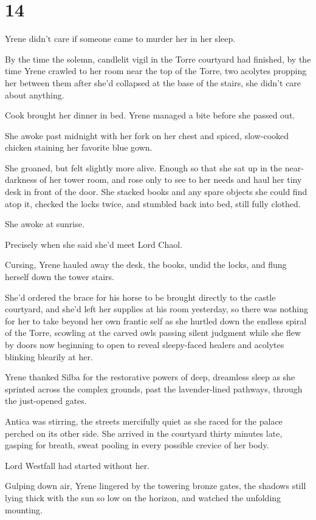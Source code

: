 
\chapter{14}

Yrene didn't care if someone came to murder her in her sleep.

By the time the solemn, candlelit vigil in the Torre courtyard had finished, by the time Yrene crawled to her room near the top of the Torre, two acolytes propping her between them after she'd collapsed at the base of the stairs, she didn't care about anything.

Cook brought her dinner in bed.
Yrene managed a bite before she passed out.

She awoke past midnight with her fork on her chest and spiced, slow-cooked chicken staining her favorite blue gown.

She groaned, but felt slightly more alive.
Enough so that she sat up in the near-darkness of her tower room, and rose only to see to her needs and haul her tiny desk in front of the door.
She stacked books and any spare objects she could find atop it, checked the locks twice, and stumbled back into bed, still fully clothed.

She awoke at sunrise.

Precisely when she said she'd meet Lord Chaol.

Cursing, Yrene hauled away the desk, the books, undid the locks, and flung herself down the tower stairs.

She'd ordered the brace for his horse to be brought directly to the castle courtyard, and she'd left her supplies at his room yesterday, so there was nothing for her to take beyond her own frantic self as she hurtled down the endless spiral of the Torre, scowling at the carved owls passing silent judgment while she flew by doors now beginning to open to reveal sleepy-faced healers and acolytes blinking blearily at her.

Yrene thanked Silba for the restorative powers of deep, dreamless sleep as she sprinted across the complex grounds, past the lavender-lined pathways, through the just-opened gates.

Antica was stirring, the streets mercifully quiet as she raced for the palace perched on its other side.
She arrived in the courtyard thirty minutes late, gasping for breath, sweat pooling in every possible crevice of her body.

Lord Westfall had started without her.

Gulping down air, Yrene lingered by the towering bronze gates, the shadows still lying thick with the sun so low on the horizon, and watched the unfolding mounting.

